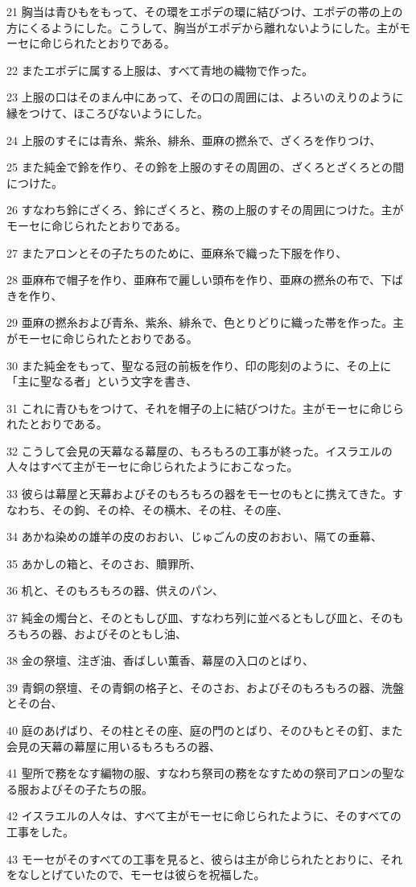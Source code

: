 \par 21 胸当は青ひもをもって、その環をエポデの環に結びつけ、エポデの帯の上の方にくるようにした。こうして、胸当がエポデから離れないようにした。主がモーセに命じられたとおりである。
\par 22 またエポデに属する上服は、すべて青地の織物で作った。
\par 23 上服の口はそのまん中にあって、その口の周囲には、よろいのえりのように縁をつけて、ほころびないようにした。
\par 24 上服のすそには青糸、紫糸、緋糸、亜麻の撚糸で、ざくろを作りつけ、
\par 25 また純金で鈴を作り、その鈴を上服のすその周囲の、ざくろとざくろとの間につけた。
\par 26 すなわち鈴にざくろ、鈴にざくろと、務の上服のすその周囲につけた。主がモーセに命じられたとおりである。
\par 27 またアロンとその子たちのために、亜麻糸で織った下服を作り、
\par 28 亜麻布で帽子を作り、亜麻布で麗しい頭布を作り、亜麻の撚糸の布で、下ばきを作り、
\par 29 亜麻の撚糸および青糸、紫糸、緋糸で、色とりどりに織った帯を作った。主がモーセに命じられたとおりである。
\par 30 また純金をもって、聖なる冠の前板を作り、印の彫刻のように、その上に「主に聖なる者」という文字を書き、
\par 31 これに青ひもをつけて、それを帽子の上に結びつけた。主がモーセに命じられたとおりである。
\par 32 こうして会見の天幕なる幕屋の、もろもろの工事が終った。イスラエルの人々はすべて主がモーセに命じられたようにおこなった。
\par 33 彼らは幕屋と天幕およびそのもろもろの器をモーセのもとに携えてきた。すなわち、その鉤、その枠、その横木、その柱、その座、
\par 34 あかね染めの雄羊の皮のおおい、じゅごんの皮のおおい、隔ての垂幕、
\par 35 あかしの箱と、そのさお、贖罪所、
\par 36 机と、そのもろもろの器、供えのパン、
\par 37 純金の燭台と、そのともしび皿、すなわち列に並べるともしび皿と、そのもろもろの器、およびそのともし油、
\par 38 金の祭壇、注ぎ油、香ばしい薫香、幕屋の入口のとばり、
\par 39 青銅の祭壇、その青銅の格子と、そのさお、およびそのもろもろの器、洗盤とその台、
\par 40 庭のあげばり、その柱とその座、庭の門のとばり、そのひもとその釘、また会見の天幕の幕屋に用いるもろもろの器、
\par 41 聖所で務をなす編物の服、すなわち祭司の務をなすための祭司アロンの聖なる服およびその子たちの服。
\par 42 イスラエルの人々は、すべて主がモーセに命じられたように、そのすべての工事をした。
\par 43 モーセがそのすべての工事を見ると、彼らは主が命じられたとおりに、それをなしとげていたので、モーセは彼らを祝福した。


